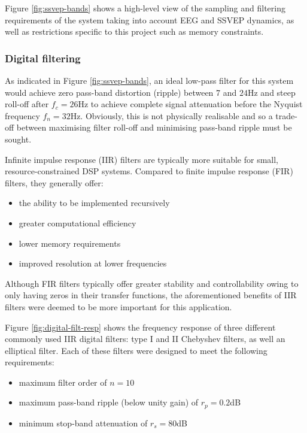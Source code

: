 Figure \ref{fig:ssvep-bands} shows a high-level view of the sampling and filtering requirements of the system taking into account EEG and SSVEP dynamics, as well as restrictions specific to this project such as memory constraints. 

\subsubsection{Digital filtering}
As indicated in Figure \ref{fig:ssvep-bands}, an ideal low-pass filter for this system would achieve zero pass-band distortion (ripple) between 7 and $24$Hz and steep roll-off after $f_c=26$Hz to achieve complete signal attenuation before the Nyquist frequency $f_n=32$Hz. Obviously, this is not physically realisable and so a trade-off between maximising filter roll-off and minimising pass-band ripple must be sought.  

Infinite impulse response (IIR) filters are typically more suitable for small, resource-constrained DSP systems. Compared to finite impulse response (FIR) filters, they generally offer:
\begin{itemize}
    \item the ability to be implemented recursively
    \item greater computational efficiency
    \item lower memory requirements
    \item improved resolution at lower frequencies
\end{itemize}
Although FIR filters typically offer greater stability and controllability owing to only having zeros in their transfer functions, the aforementioned benefits of IIR filters were deemed to be more important for this application. 

Figure \ref{fig:digital-filt-resp} shows the frequency response of three different commonly used IIR digital filters: type I and II Chebyshev filters, as well an elliptical filter. Each of these filters were designed to meet the following requirements:
\begin{itemize}
\label{list:filter-design-reqs}
    \item maximum filter order of $n=10$
    \item maximum pass-band ripple (below unity gain) of $r_p=0.2$dB 
    \item minimum stop-band attenuation of $r_s=80$dB
\end{itemize}

